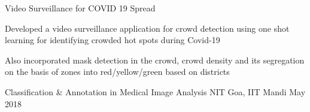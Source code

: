 


\begin{cventries}

  \cventry
    {} %
    {Video Surveillance for COVID 19 Spread } %
    {} %
    {} %
    {
      \begin{cvitems} %
        \item Developed a video surveillance application for crowd detection using one shot learning for identifying crowded hot spots during Covid-19
        \item Also incorporated mask detection in the crowd, crowd density and its segregation on the basis of zones into red/yellow/green based on districts 
      \end{cvitems}
    }

  \cventry
    {} %
    {Classification \& Annotation in Medical Image Analysis} %
    {NIT Goa, IIT Mandi} %
    { May 2018} %
    {
    }





\end{cventries}
